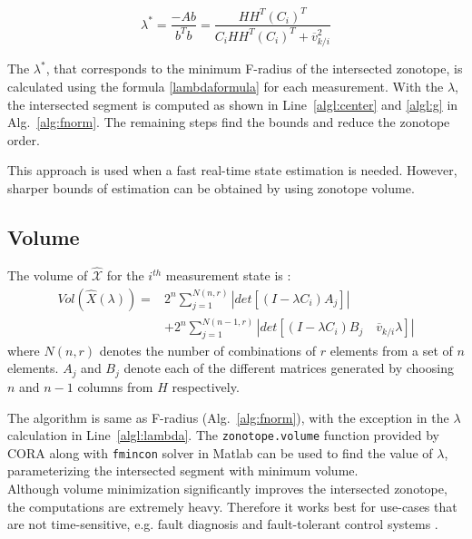 \begin{equation}
\label{lambdaformula}
\lambda^* = \frac{-Ab }{b^Tb}  = \frac{HH^T(C_i)^T}{C_i HH^T(C_i)^T + \overline{v}_{k/i}^2} 
\end{equation}

The $\lambda^*$, that corresponds to the minimum F-radius of the intersected zonotope, is calculated using the formula \eqref{lambdaformula} for each measurement. With the $\lambda$, the intersected segment is computed as shown in Line~\ref{algl:center} and \ref{algl:g} in Alg.~\ref{alg:fnorm}. The remaining steps find the bounds and reduce the zonotope order. 

This approach is used when a fast real-time state estimation is needed. However, sharper bounds of estimation can be obtained by using zonotope volume.

\subsection{Volume}
The volume of $\mathcal{\hat{X}}$ for the $i^{th}$ measurement state is \cite{Alamo2005}:
\begin{equation}
\label{volumeformula}
\begin{split}
Vol(\hat{X}(\lambda))=& 2^n \sum^{N(n,r)}_{j=1} |det[(I - \lambda C_i)A_j]|\\
&+ 2^n \sum^{N(n-1,r)}_{j=1} |det[(I- \lambda C_i)B_j\quad \overline{v}_{k/i}\lambda]|
\end{split}
\end{equation}
where $N(n,r)$ denotes the number of combinations of $r$ elements from a set of $n$ elements. $A_j$ and $B_j$ denote each of the different matrices generated by choosing $n$ and $n-1$ columns from $H$ respectively. 

The algorithm is same as F-radius (Alg.~\ref{alg:fnorm}), with the exception in the $\lambda$ calculation in Line~\ref{algl:lambda}. The \texttt{zonotope.volume} function provided by CORA along with \texttt{fmincon} solver in Matlab\textsuperscript{\tiny\textregistered}  can be used to find the value of $\lambda$, parameterizing the intersected segment with minimum volume. \\
Although volume minimization significantly improves the intersected zonotope, the computations are extremely heavy. Therefore it works best for use-cases that are not time-sensitive, e.g. fault diagnosis and fault-tolerant control systems \cite{Puig2010}. 
